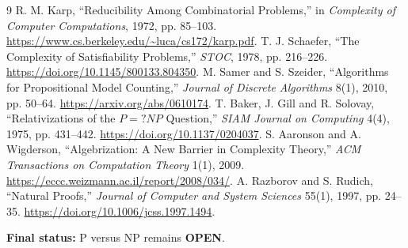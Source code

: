 \documentclass[11pt]{article}
\newcommand{\OPEN}{\textbf{OPEN}}
\begin{document}
\begin{thebibliography}{9}
R. M. Karp, ``Reducibility Among Combinatorial Problems,'' in
\emph{Complexity of Computer Computations}, 1972, pp. 85--103.
\url{https://www.cs.berkeley.edu/~luca/cs172/karp.pdf}.
T. J. Schaefer, ``The Complexity of Satisfiability Problems,''
\emph{STOC}, 1978, pp. 216--226.
\url{https://doi.org/10.1145/800133.804350}.
M. Samer and S. Szeider, ``Algorithms for Propositional Model Counting,''
\emph{Journal of Discrete Algorithms} 8(1), 2010, pp. 50--64.
\url{https://arxiv.org/abs/0610174}.
T. Baker, J. Gill and R. Solovay, ``Relativizations of the \(P=?NP\)
Question,'' \emph{SIAM Journal on Computing} 4(4), 1975, pp. 431--442.
\url{https://doi.org/10.1137/0204037}.
S. Aaronson and A. Wigderson, ``Algebrization: A New Barrier in Complexity
Theory,'' \emph{ACM Transactions on Computation Theory} 1(1), 2009.
\url{https://eccc.weizmann.ac.il/report/2008/034/}.
A. Razborov and S. Rudich, ``Natural Proofs,''
\emph{Journal of Computer and System Sciences} 55(1), 1997, pp. 24--35.
\url{https://doi.org/10.1006/jcss.1997.1494}.
\end{thebibliography}

\noindent\textbf{Final status:} P versus NP remains \OPEN.

\end{document}
